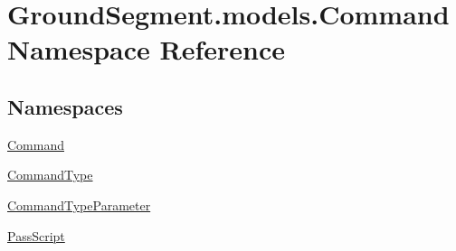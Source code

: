 \hypertarget{namespace_ground_segment_1_1models_1_1_command}{}\section{Ground\+Segment.\+models.\+Command Namespace Reference}
\label{namespace_ground_segment_1_1models_1_1_command}
\subsection*{Namespaces}
\begin{DoxyCompactItemize}
\item 
 \hyperlink{namespace_ground_segment_1_1models_1_1_command_1_1_command}{Command}
\item 
 \hyperlink{namespace_ground_segment_1_1models_1_1_command_1_1_command_type}{Command\+Type}
\item 
 \hyperlink{namespace_ground_segment_1_1models_1_1_command_1_1_command_type_parameter}{Command\+Type\+Parameter}
\item 
 \hyperlink{namespace_ground_segment_1_1models_1_1_command_1_1_pass_script}{Pass\+Script}
\end{DoxyCompactItemize}
